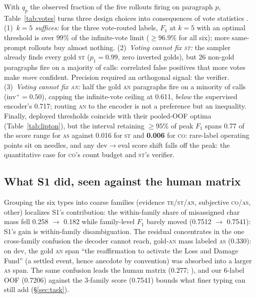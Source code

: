\documentclass[11pt]{article}
\newcommand{\lab}[1]{\textsc{#1}}
\newcommand{\co}{\lab{co}}
\newcommand{\as}{\lab{as}}
\newcommand{\te}{\lab{te}}
\newcommand{\st}{\lab{st}}
\newcommand{\an}{\lab{an}}
\begin{document}
With $q_p$ the observed fraction of the five rollouts firing on paragraph
$p$, Table~\ref{tab:votes} turns three design choices into consequences
of vote statistics
\citep{chen-etal-2024-llmcalls,wang-etal-2023-selfconsistency,loo-2025-selfconsistency-plateau}.
(1)~\emph{$k{=}5$ suffices:} for the three vote-routed labels, $F_1$ at
$k{=}5$ with an optimal threshold is over $99\%$ of the infinite-vote
limit (${\geq}96.9\%$ for all six); more same-prompt rollouts buy almost
nothing. (2)~\emph{Voting cannot fix
\st:} the sampler already finds every gold \st{} ($p_1{=}0.99$, zero
inverted golds), but 26 non-gold paragraphs fire on a majority of
calls: correlated false positives that more votes make \emph{more}
confident. Precision required an orthogonal signal: the verifier.
(3)~\emph{Voting cannot fix \an:} half the gold \an{} paragraphs fire on
a minority of calls (inv$^{+}{=}0.50$), capping the infinite-vote
ceiling at 0.611, \emph{below} the supervised encoder's 0.717; routing
\an{} to the encoder is not a preference but an inequality. Finally,
deployed thresholds coincide with their pooled-OOF optima
(Table~\ref{tab:lipton}), but the interval retaining ${\geq}95\%$
of peak $F_1$ spans 0.77 of the score range for \as{} against 0.016 for
\st{} and \textbf{0.006} for \co: rare-label operating points sit on
needles, and any dev$\rightarrow$eval score shift falls off the
peak: the quantitative case for \co's count budget and \st's verifier.

\subsection{What S1 did, seen against the human matrix}
\label{sec:families}

Grouping the six types into coarse families (evidence \te/\st/\an,
subjective \co/\as, other) localizes S1's contribution: the within-family
share of misassigned char mass fell 0.258 $\rightarrow$ 0.182 while
family-level $F_1$ barely moved (0.7512 $\rightarrow$ 0.7541): S1's
gain is within-family disambiguation. The residual concentrates in the
one cross-family confusion the decoder cannot reach, gold-\an{} mass
labeled \as{} (0.330): on dev, the gold \an{} span ``the reaffirmation
to activate the Loss and Damage Fund'' (a settled
event, hence anecdote by convention) was absorbed into a larger \as{}
span. The same confusion leads the human matrix (0.277;
\citealp{alkhatib-etal-2016-news}), and our 6-label OOF (0.7206) against
the 3-family score (0.7541) bounds what finer typing can still add
(\S\ref{sec:task}).
\end{document}
